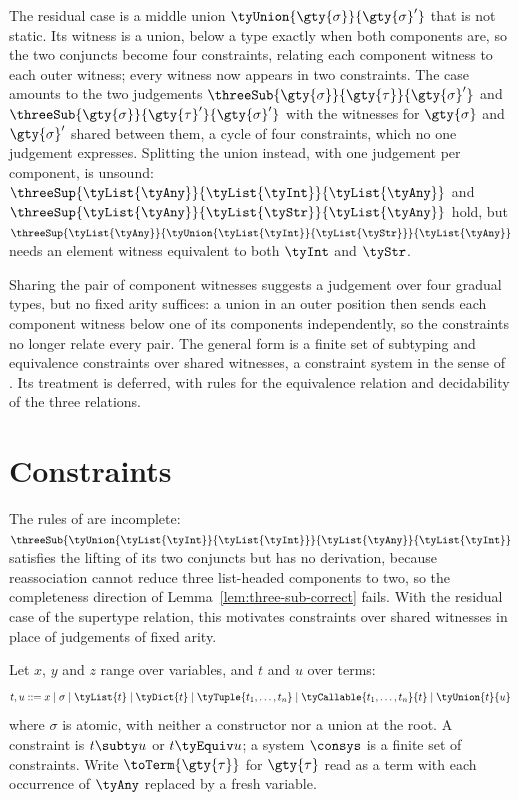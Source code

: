 

The residual case is a middle union $\tyUnion{\gty{\sigma}}{\gty{\sigma}'}$ that is not static.
Its witness is a union, below a type exactly when both components are, so the two conjuncts become
four constraints, relating each component witness to each outer witness; every witness now appears
in two constraints. The case amounts to the two judgements
$\threeSub{\gty{\sigma}}{\gty{\tau}}{\gty{\sigma}'}$ and
$\threeSub{\gty{\sigma}}{\gty{\tau}'}{\gty{\sigma}'}$ with the witnesses for $\gty{\sigma}$ and
$\gty{\sigma}'$ shared between them, a cycle of four constraints, which no one judgement
expresses. Splitting the union instead, with one judgement per component, is unsound:
$\threeSup{\tyList{\tyAny}}{\tyList{\tyInt}}{\tyList{\tyAny}}$ and
$\threeSup{\tyList{\tyAny}}{\tyList{\tyStr}}{\tyList{\tyAny}}$ hold, but
$\threeSup{\tyList{\tyAny}}{\tyUnion{\tyList{\tyInt}}{\tyList{\tyStr}}}{\tyList{\tyAny}}$ needs
an element witness equivalent to both $\tyInt$ and $\tyStr$.

Sharing the pair of component witnesses suggests a judgement over four gradual types, but no
fixed arity suffices: a union in an outer position then sends each component witness below
one of its components independently, so the constraints no longer relate every pair. The general
form is a finite set of subtyping and equivalence constraints over shared witnesses, a constraint
system in the sense of \citet{garcia2015}. Its treatment is deferred, with rules for the
equivalence relation and decidability of the three relations.

\section{Constraints}
\label{sec:constraints}

The rules of  are incomplete:
$\threeSub{\tyUnion{\tyList{\tyInt}}{\tyList{\tyInt}}}{\tyList{\tyAny}}{\tyList{\tyInt}}$
satisfies the lifting of its two conjuncts but has no derivation, because reassociation cannot
reduce three list-headed components to two, so the completeness direction of
Lemma~\ref{lem:three-sub-correct} fails. With the residual case of the supertype relation, this
motivates constraints over shared witnesses in place of judgements of fixed arity.

\begin{definition}[Constraints]
\label{def:constraints}
Let $x$, $y$ and $z$ range over variables, and $t$ and $u$ over terms:
\[
t, u \mathrel{::=} x \mid \sigma \mid \tyList{t} \mid \tyDict{t} \mid \tyTuple{t_1, \ldots, t_n}
  \mid \tyCallable{t_1, \ldots, t_n}{t} \mid \tyUnion{t}{u}
\]
where $\sigma$ is atomic, with neither a constructor nor a union at the root. A constraint is
$t \subty u$ or $t \tyEquiv u$; a system $\consys$ is a finite set of constraints. Write
$\toTerm{\gty{\tau}}$ for $\gty{\tau}$ read as a term with each occurrence of $\tyAny$ replaced
by a fresh variable.
\end{definition}

